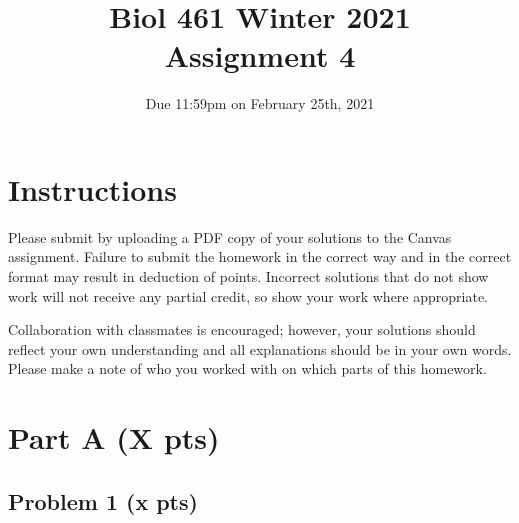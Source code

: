 \documentclass{article}
\title{Biol 461 Winter 2021\\ Assignment 4}
\author{Due 11:59pm on February 25th, 2021}
\date{}
\begin{document}
\maketitle

\section*{Instructions}

Please submit by uploading a PDF copy of your solutions to the Canvas assignment. 
Failure to submit the homework in the correct way and in the correct format may result in deduction of points. 
Incorrect solutions that do not show work will not receive any partial credit, so show your work where appropriate.

Collaboration with classmates is encouraged; however, your solutions should reflect your own understanding and all explanations should be in your own words. 
Please make a note of who you worked with on which parts of this homework.

\section*{Part A (X pts)}

\subsection*{Problem 1 (x pts)}
\end{document}
